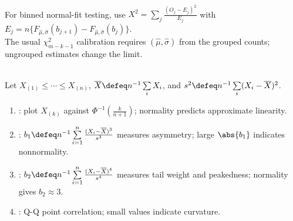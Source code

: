 \begin{remark} \label{rem:grouped-normality-chi-square-caution} \\
For binned normal-fit testing, use $X^2=\sum\limits_j\frac{(O_j-E_j)^2}{E_j}$ with $E_j=n\{F_{\widehat\mu,\widehat\sigma}(b_{j+1})-F_{\widehat\mu,\widehat\sigma}(b_j)\}$.\\
The usual $\chi^2_{m-k-1}$ calibration requires $(\widehat\mu,\widehat\sigma)$ from the grouped counts; ungrouped estimates change the limit.
\end{remark}

\begin{definition} \label{def:normality-diagnostics} \\
Let $X_{(1)}\leq\cdots\leq X_{(n)}$, $\overline{X}\defeq n^{-1}\sum\limits_iX_i$, and $s^2\defeq n^{-1}\sum\limits_i(X_i-\overline{X})^2$.
\begin{enumerate}[label=(\roman*)]
\setlength{\itemsep}{0pt}
\item {}: plot $X_{(k)}$ against $\Phi^{-1}(\frac{k}{n+1})$; normality predicts approximate linearity.
\item {}: $b_1\defeq n^{-1}\sum\limits_{i=1}^n\frac{(X_i-\overline{X})^3}{s^3}$ measures asymmetry; large $\abs{b_1}$ indicates nonnormality.
\item {}: $b_2\defeq n^{-1}\sum\limits_{i=1}^n\frac{(X_i-\overline{X})^4}{s^4}$ measures tail weight and peakedness; normality gives $b_2\approx3$.
\item {}: Q-Q point correlation; small values indicate curvature.
\end{enumerate}
\end{definition}
